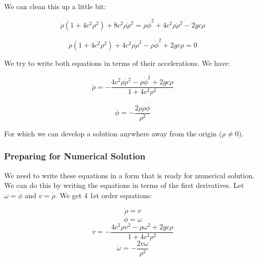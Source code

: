 \documentclass[11pt]{article}
\begin{document}
We can clean this up a little bit:

\[\ddot{\rho}(1+4c^2\rho^2) + 8c^2\rho\dot{\rho}^2 = \rho\dot{\phi}^2 + 4c^2\rho\dot{\rho}^2 - 2gc\rho\]

\[\ddot{\rho}(1+4c^2\rho^2) + 4c^2\rho\dot{\rho}^2 - \rho\dot{\phi}^2 + 2gc\rho = 0\]

We try to write both equations in terms of their accelerations. We have:

\[\ddot{\rho} = -\dfrac{4c^2\rho\dot{\rho}^2 - \rho\dot{\phi}^2 + 2gc\rho}{1+4c^2\rho^2}\]

\[\ddot{\phi} = - \dfrac{2\rho\dot{\rho}\dot{\phi}}{\rho^2}\]

For which we can develop a solution anywhere away from the origin
(\(\rho \neq 0\)).

\subsubsection{Preparing for Numerical
Solution}\label{preparing-for-numerical-solution}

We need to write these equations in a form that is ready for numerical
solution. We can do this by writing the equations in terms of the first
derivatives. Let \(\omega = \dot{\phi}\) and \(v = \dot{\rho}\). We get
4 1st order equations:

\[\dot{\rho} = v\] \[\dot{\phi} = \omega\]
\[\dot{v} = -\dfrac{4c^2\rho v^2 - \rho\omega^2 + 2gc\rho}{1+4c^2\rho^2}\]
\[\dot{\omega} = - \dfrac{2 v\omega}{\rho^2}\]

    


    
    
    
\end{document}

